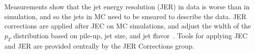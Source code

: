 Measurements show that the jet energy resolution (JER) in data is worse than in simulation, and so the jets in MC need to be smeared to describe the data. JER corrections are applied after JEC on MC simulations, and adjust the width of the $p_{T}$ distribution based on pile-up, jet size, and jet flavor~\cite{twiki_JetResolution_JER}. Tools for applying JEC and JER are provided centrally by the JER Corrections group. 